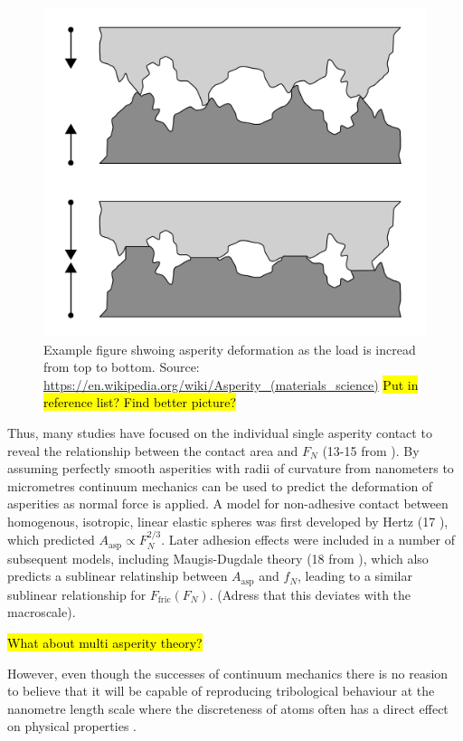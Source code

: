 \begin{figure}[H]
  \centering
  \includegraphics[width=0.5\linewidth]{figures/theory/asperities.png}
  \caption{Example figure shwoing asperity deformation as the load is incread from top to bottom. Source: \url{https://en.wikipedia.org/wiki/Asperity\_(materials\_science)} \hl{Put in reference list? Find better picture?}}
  \label{fig:asperity_contact}
\end{figure}


Thus, many studies have focused on the individual single asperity contact to
reveal the relationship between the contact area and $F_N$ (13-15 from
\cite{mo_friction_2009}). By assuming perfectly smooth asperities with radii of
curvature from nanometers to micrometres continuum mechanics can be used
to predict the deformation of asperities as normal force is applied. A model for
non-adhesive contact between homogenous, isotropic, linear elastic spheres was
first developed by Hertz (17 \cite{mo_friction_2009}), which predicted
$A_{\text{asp}} \propto F_N^{2/3}$. Later adhesion effects were included in a
number of subsequent models, including Maugis-Dugdale theory (18 from
\cite{mo_friction_2009}), which also predicts a sublinear relatinship between
$A_{\text{asp}}$ and $f_N$, leading to a similar sublinear relationship for $F_\text{fric}(F_N)$. (Adress that this deviates with the macroscale). 

\hl{What about multi asperity theory?}

However, even though the successes of continuum mechanics there is no reasion to believe that it will be capable of reproducing tribological behaviour at the nanometre length scale where the discreteness of atoms often has a direct effect on physical properties \cite{Szlufarska_2008}.






